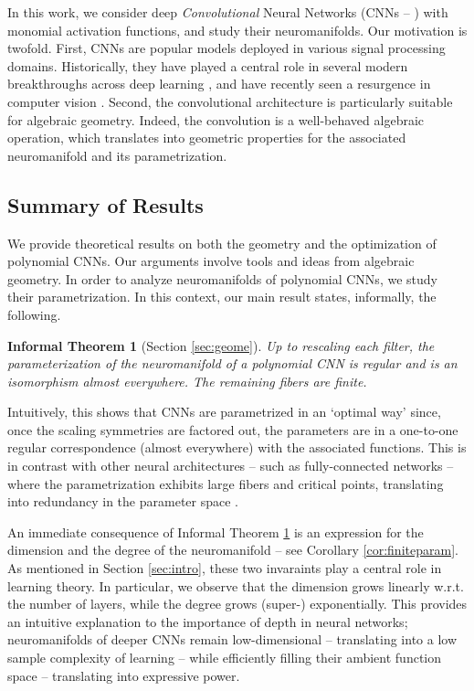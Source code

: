 \documentclass[twoside]{article}
\theoremstyle{plain}%
\newtheorem{infthm}[thm]{Informal Theorem}
\theoremstyle{definition}
\theoremstyle{remark}
\begin{document}
In this work, we consider deep \emph{Convolutional} Neural Networks (CNNs --  \cite{fukushima1979neural, lecun1995convolutional}) with monomial activation functions, and study their neuromanifolds. Our motivation is twofold. First, CNNs are popular models deployed in various signal processing domains. Historically, they have played a central role in several modern breakthroughs across deep learning \parencite{krizhevsky2012imagenet, van2016wavenet}, and have recently seen a resurgence in computer vision \parencite{liu2022convnet}. Second, the convolutional architecture is particularly suitable for algebraic geometry. Indeed, the convolution is a well-behaved algebraic operation, which translates into geometric properties for the associated neuromanifold and its parametrization. 

\subsection{Summary of Results}\label{sec:summres}
We provide theoretical results on both the geometry and the optimization of polynomial CNNs. Our arguments involve tools and ideas from algebraic geometry. In order to analyze neuromanifolds of polynomial CNNs, we study their parametrization. In this context, our main result states, informally, the following. %
\begin{infthm}[Section \ref{sec:geome}]\label{thm:inf1}
Up to rescaling each filter, the parameterization of the neuromanifold of a polynomial CNN is regular and is an isomorphism almost everywhere. The remaining fibers are finite. 
\end{infthm}
Intuitively, this shows that CNNs are parametrized in an `optimal way' since, once the scaling symmetries are factored out, the parameters are in a one-to-one regular correspondence (almost everywhere) with the associated functions. This is in contrast with other neural architectures -- such as fully-connected networks -- where the parametrization exhibits large fibers and critical points, translating into redundancy in the parameter space \parencite{kileel2019expressive}. 

An immediate consequence of Informal Theorem \ref{thm:inf1} is an expression for the dimension and the degree of the neuromanifold -- see Corollary \ref{cor:finiteparam}. As mentioned in Section \ref{sec:intro}, these two invaraints play a central role in learning theory. In particular, we observe that the dimension grows linearly w.r.t. the number of layers, while the degree grows (super-) exponentially. This provides an intuitive explanation to the importance of depth in neural networks; neuromanifolds of deeper CNNs remain low-dimensional -- translating into a low sample complexity of learning -- while efficiently filling their ambient function space -- translating into expressive power.  
\end{document}
